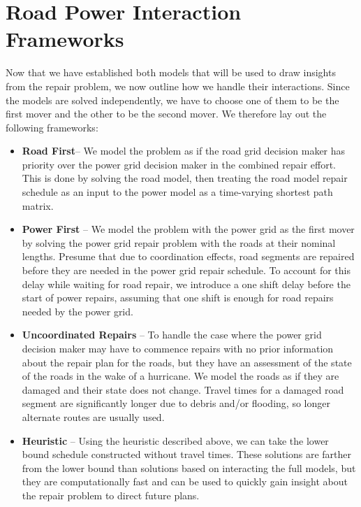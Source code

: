 \section{Road Power Interaction Frameworks}
Now that we have established both models that will be used to draw insights from the repair problem, we now outline how we handle their interactions. Since the models are solved independently, we have to choose one of them to be the first mover and the other to be the second mover. We therefore lay out the following frameworks:
\begin{itemize}
	\item \textbf{Road First}-- We model the problem as if the road grid decision maker has priority over the power grid decision maker in the combined repair effort. This is done by solving the road model, then treating the road model repair schedule as an input to the power model as a time-varying shortest path matrix.
	\item \textbf{Power First} -- We model the problem with the power grid as the first mover by solving the power grid repair problem with the roads at their nominal lengths. Presume that due to coordination effects, road segments are repaired before they are needed in the power grid repair schedule. To account for this delay while waiting for road repair, we introduce a one shift delay before the start of power repairs, assuming that one shift is enough for road repairs needed by the power grid.
	\item \textbf{Uncoordinated Repairs} -- To handle the case where the power grid decision maker may have to commence repairs with no prior information about the repair plan for the roads, but they have an assessment of the state of the roads in the wake of a hurricane. We model the roads as if they are damaged and their state does not change. Travel times for a damaged road segment are significantly longer due to debris and/or flooding, so longer alternate routes are usually used.
	\item \textbf{Heuristic} -- Using the heuristic described above, we can take the lower bound schedule constructed without travel times. These solutions are farther from the lower bound than solutions based on interacting the full models, but they are computationally fast and can be used to quickly gain insight about the repair problem to direct future plans.
\end{itemize}

